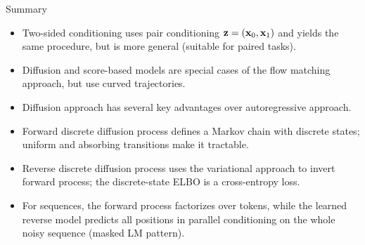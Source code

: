 \documentclass{beamer}
\begin{document}
\begin{frame}{Summary}
	\begin{itemize}
		\item Two-sided conditioning uses pair conditioning $\mathbf{z} = (\mathbf{x}_0, \mathbf{x}_1)$ and yields the same procedure, but is more general (suitable for paired tasks).
		\vfill
		\item Diffusion and score-based models are special cases of the flow matching approach, but use curved trajectories.
		\vfill
		\item Diffusion approach has several key advantages over autoregressive approach.
		\vfill
		\item Forward discrete diffusion process defines a Markov chain with discrete states; uniform and absorbing transitions make it tractable.
		\vfill
		\item Reverse discrete diffusion process uses the variational approach to invert forward process; the discrete-state ELBO is a cross-entropy loss.
		\vfill
		\item For sequences, the forward process factorizes over tokens, while the learned reverse model predicts all positions in parallel conditioning on the whole noisy sequence (masked LM pattern).
	\end{itemize}
\end{frame}
\end{document}

